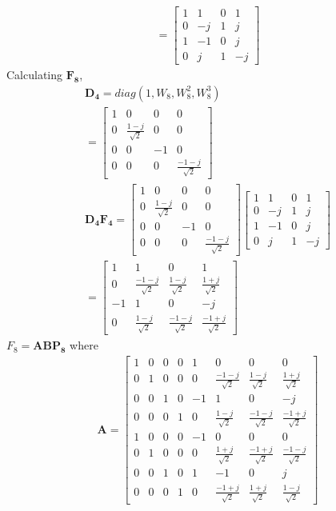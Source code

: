 \documentclass[journal,12pt,twocolumn]{IEEEtran}
\providecommand{\brak}[1]{\ensuremath{\left(#1\right)}}
\let\vec\mathbf
\numberwithin{equation}{section}
\renewcommand\thesection{\arabic{section}}
\begin{document}
\begin{enumerate}[label=\arabic*.,ref=\thesection.\theenumi]
\begin{align}
=\begin{bmatrix}
1&1&0&1\\0&-j&1&j\\1&-1&0&j\\0&j&1&-j
\end{bmatrix}
\end{align}
Calculating $\vec{F_8}$,
\begin{align}
\vec{D_4}=diag\brak{1,W_8,W_8^2,W_8^3}\\
=\begin{bmatrix}
1&0&0&0\\0&\frac{1-j}{\sqrt{2}}&0&0\\0&0&-1&0\\0&0&0&\frac{-1-j}{\sqrt{2}}
\end{bmatrix}\\
\vec{D_4F_4}=\begin{bmatrix}
1&0&0&0\\0&\frac{1-j}{\sqrt{2}}&0&0\\0&0&-1&0\\0&0&0&\frac{-1-j}{\sqrt{2}}
\end{bmatrix}\begin{bmatrix}
1&1&0&1\\0&-j&1&j\\1&-1&0&j\\0&j&1&-j
\end{bmatrix}\\
=\begin{bmatrix}
1&1&0&1\\0&\frac{-1-j}{\sqrt{2}}&\frac{1-j}{\sqrt{2}}&\frac{1+j}{\sqrt{2}}\\-1&1&0&-j\\0&\frac{1-j}{\sqrt{2}}&\frac{-1-j}{\sqrt{2}}&\frac{-1+j}{\sqrt{2}}
\end{bmatrix}
\end{align}
$F_8=\vec{ABP_8}$ where
\begin{align}
\vec{A}=\begin{bmatrix}
1&0&0&0&1&0&0&0\\0&1&0&0&0&\frac{-1-j}{\sqrt{2}}&\frac{1-j}{\sqrt{2}}&\frac{1+j}{\sqrt{2}}\\0&0&1&0&-1&1&0&-j\\0&0&0&1&0&\frac{1-j}{\sqrt{2}}&\frac{-1-j}{\sqrt{2}}&\frac{-1+j}{\sqrt{2}}\\1&0&0&0&-1&0&0&0\\0&1&0&0&0&\frac{1+j}{\sqrt{2}}&\frac{-1+j}{\sqrt{2}}&\frac{-1-j}{\sqrt{2}}\\0&0&1&0&1&-1&0&j\\0&0&0&1&0&\frac{-1+j}{\sqrt{2}}&\frac{1+j}{\sqrt{2}}&\frac{1-j}{\sqrt{2}}

\end{bmatrix}
\end{align}
\end{enumerate}
\end{document}
